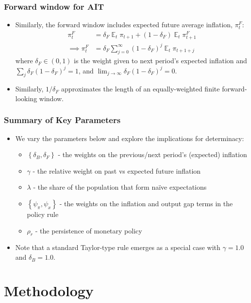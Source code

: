 \documentclass{beamer}
\DeclareMathOperator{\E}{\mathbb{E}}
\begin{document}
\begin{frame}
	\frametitle{Forward window for AIT}
	\begin{itemize}
		\setlength{\itemsep}{1em}
		\item Similarly, the forward window includes expected future average inflation, $\pi_t^F$:
		\begin{align}\label{eq:forward}
			\pi_t^F &= \delta_F \E_t \pi_{t+1} + (1-\delta_F) \E_t \pi_{t+1}^F \\
			\implies \pi_t^F &= \delta_F \sum_{j=0}^{\infty} (1-\delta_F)^j \E_t \pi_{t+1+j} \nonumber
		\end{align}
		where $\delta_F \in (0,1)$ is the weight given to next period's expected inflation and $\sum_j \delta_F (1-\delta_F)^{j}=1$, and $\lim_{j \to \infty} \delta_F (1-\delta_F)^j=0$.
		\item Similarly, $1/ \delta_F$ approximates the length of an equally-weighted finite forward-looking window.
	\end{itemize}
\end{frame}

\begin{frame}
	\frametitle{Summary of Key Parameters}
	\begin{itemize}
		\item We vary the parameters below and explore the implications for determinacy: 
		\begin{itemize}
			\item  $\left\{\delta_B, \delta_F \right\}$ - the weights on the previous/next period's (expected) inflation
			\item $\gamma$ - the relative weight on past vs expected future inflation
			\item $\lambda$ - the share of the population that form na\"ive expectations
			\item  $\left\{\psi_\pi, \psi_x \right\}$ - the weights on the inflation and output gap terms in the policy rule
			\item $\rho_r$ - the persistence of monetary policy
		\end{itemize}
		\item Note that a standard Taylor-type rule emerges as a special case with $\gamma=1.0$ and $\delta_B=1.0$.
	\end{itemize}
\end{frame}

\section*{Methodology}
\end{document}
